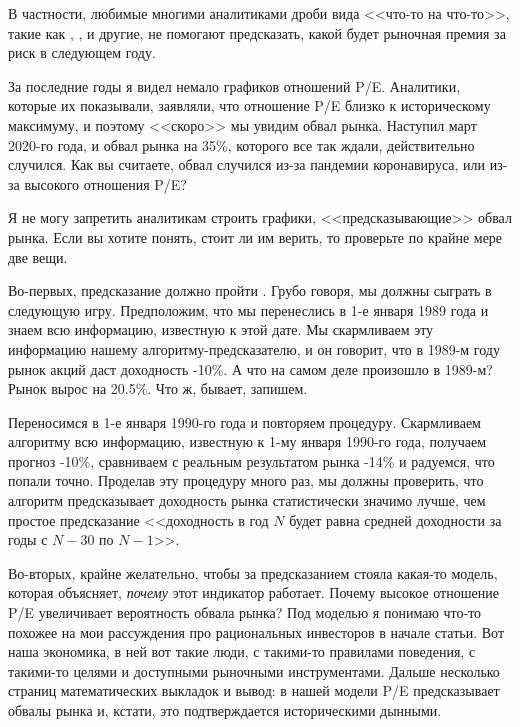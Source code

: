 В частности, любимые многими аналитиками дроби вида <<что-то на что-то>>, такие как , ,  и другие, не помогают предсказать, какой будет рыночная премия за риск в следующем году. 

За последние годы я видел немало графиков отношений P/E. Аналитики, которые их показывали, заявляли, что отношение P/E близко к историческому максимуму, и поэтому <<скоро>> мы увидим обвал рынка. Наступил март 2020-го года, и обвал рынка на 35\%, которого все так ждали, действительно случился. Как вы считаете, обвал случился из-за пандемии коронавируса, или из-за высокого отношения P/E?

Я не могу запретить аналитикам строить графики, <<предсказывающие>> обвал рынка. Если вы хотите понять, стоит ли им верить, то проверьте по крайне мере две вещи.

Во-первых, предсказание должно пройти  . Грубо говоря, мы должны сыграть в следующую игру. Предположим, что мы перенеслись в 1-е января 1989 года и знаем всю информацию, известную к этой дате. Мы скармливаем эту информацию нашему алгоритму-предсказателю, и он говорит, что в 1989-м году рынок акций даст доходность -10\%. А что на самом деле произошло в 1989-м? Рынок вырос на 20.5\%. Что ж, бывает, запишем.

Переносимся в 1-е января 1990-го года и повторяем процедуру. Скармливаем алгоритму всю информацию, известную к 1-му января 1990-го года, получаем прогноз -10\%, сравниваем с реальным результатом рынка -14\% и радуемся, что попали точно. Проделав эту процедуру много раз, мы должны проверить, что алгоритм предсказывает доходность рынка статистически значимо лучше, чем простое предсказание <<доходность в год $N$ будет равна средней доходности за годы с $N-30$ по $N-1$>>.

Во-вторых, крайне желательно, чтобы за предсказанием стояла какая-то модель, которая объясняет, \emph{почему} этот индикатор работает. Почему высокое отношение P/E увеличивает вероятность обвала рынка? Под моделью я понимаю что-то похожее на мои рассуждения про рациональных инвесторов в начале статьи. Вот наша экономика, в ней вот такие люди, с такими-то правилами поведения, с такими-то целями и доступными рыночными инструментами. Дальше несколько страниц математических выкладок и вывод: в нашей модели P/E предсказывает обвалы рынка и, кстати, это подтверждается историческими дынными.

